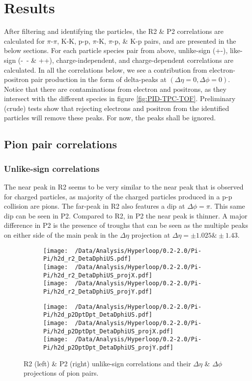 \documentclass[12pt,a4paper,twoside]{report}
\begin{document}
\chapter{Results}\label{Ch:Results}
After filtering and identifying the particles, the R2 \& P2 correlations are calculated for $\pi$-$\pi$, K-K, p-p, $\pi$-K, $\pi$-p, \& K-p pairs, and are presented in the below sections. For each particle species pair from above, unlike-sign (+-), like-sign (-\ - \& ++), charge-independent, and charge-dependent correlations are calculated. In all the correlations below, we see a contribution from electron-positron pair production in the form of delta-peaks at $(\Delta\eta=0,\Delta\phi=0)$. Notice that there are contaminations from electron and positrons, as they intersect with the different species in figure \ref{fig:PID-TPC-TOF}. Preliminary (crude) tests show that rejecting electrons and positron from the identified particles will remove these peaks. For now, the peaks shall be ignored.
\section{Pion pair correlations}
\subsection{Unlike-sign correlations}
The near peak in R2 seems to be very similar to the near peak that is observed for charged particles, as majority of the charged particles produced in a p-p collision are pions. The far-peak in R2 also features a dip at $\Delta\phi=\pi$.
This same dip can be seen in P2. Compared to R2, in P2 the near peak is thinner. A major difference in P2 is the presence of troughs that can be seen as the multiple peaks on either side of the main peak in the $\Delta\eta$ projection at $\Delta\eta=\pm1.025\&\pm1.43$.
\begin{figure}[H]
	\begin{subfigure}{0.49\linewidth}
		\texttt{[image: ~/Data/Analysis/Hyperloop/0.2-2.0/Pi-Pi/h2d\_r2\_DetaDphiUS.pdf]}\\
		\texttt{[image: ~/Data/Analysis/Hyperloop/0.2-2.0/Pi-Pi/h2d\_r2\_DetaDphiUS\_projX.pdf]}\\
		\texttt{[image: ~/Data/Analysis/Hyperloop/0.2-2.0/Pi-Pi/h2d\_r2\_DetaDphiUS\_projY.pdf]}\\
	\end{subfigure}
	\begin{subfigure}{0.49\linewidth}
		\texttt{[image: ~/Data/Analysis/Hyperloop/0.2-2.0/Pi-Pi/h2d\_p2DptDpt\_DetaDphiUS.pdf]}\\
		\texttt{[image: ~/Data/Analysis/Hyperloop/0.2-2.0/Pi-Pi/h2d\_p2DptDpt\_DetaDphiUS\_projX.pdf]}\\
		\texttt{[image: ~/Data/Analysis/Hyperloop/0.2-2.0/Pi-Pi/h2d\_p2DptDpt\_DetaDphiUS\_projY.pdf]}\\
	\end{subfigure}
	\caption{R2 (left) \& P2 (right) unlike-sign correlations and their $\Delta\eta$ \& $\Delta\phi$ projections of pion pairs.}
\end{figure}
\end{document}
